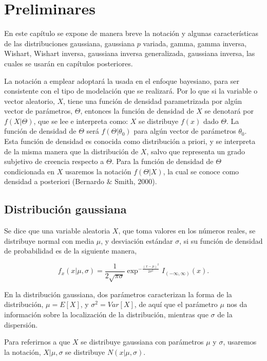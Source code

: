 \chapter{Preliminares}

En este capítulo se expone de manera breve la notación y algunas características de las distribuciones gaussiana, gaussiana $p$ variada, gamma, gamma inversa, Wishart, Wishart inversa, gaussiana inversa generalizada, gaussiana inversa, las cuales se usarán en capítulos posteriores.

La notación a emplear adoptará la usada en el enfoque bayesiano, para ser consistente
con el tipo de modelación que se realizará. Por lo que si la variable o vector aleatorio, $X$, tiene una función de densidad parametrizada por algún vector de parámetros, $\Theta$, entonces la función de densidad de $X$ se denotará por $f(X|\Theta)$, que se lee e interpreta como: $X$ se distribuye $f(x)$ dado $\Theta$. La función de densidad de $\Theta$ será $f(\Theta|\theta_{0})$ para algún vector de parámetros $\theta_{0}$. Esta función de densidad es conocida como distribución a priori, y se interpreta de la misma manera que la distribución de $X$, salvo que representa un grado subjetivo de creencia respecto a $\Theta$. Para la función de densidad de $\Theta$ condicionada en $X$ usaremos la notación $f(\Theta|X)$, la cual se conoce como densidad a posteriori (Bernardo $\&$ Smith, $2000$)\cite{}. 

\section{Distribución gaussiana}
Se dice que una variable aleatoria $X$, que toma valores en los números reales, se distribuye normal con media $\mu$, y desviación estándar $\sigma$, si su función de densidad de probabilidad es de la siguiente manera,

\begin{equation}
	f_{x}(x|\mu, \sigma)=\frac{1}{2\sqrt{\pi \sigma}}\exp^{-\frac{(x-\mu)^2}{2\sigma^2}}I_{(-\infty,\infty)}(x).
\end{equation}

En la distribución gaussiana, dos parámetros caracterizan la forma de la distribución,  $\mu=E[X]$, y $\sigma^2=Var[X]$, de aquí que el parámetro $\mu$ nos da información sobre la localización de la distribución, mientras que $\sigma$ de la dispersión.

Para referirnos a que $X$ se distribuye gaussiana con parámetros $\mu$ y $\sigma$, usaremos la notación, $X|\mu,\sigma$ se distribuye $N(x|\mu,\sigma)$.

